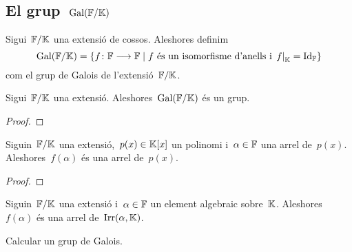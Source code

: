 \documentclass[../Apunts.tex]{subfiles}
\begin{document}
\subsection{El grup~\(\operatorname{Gal}(\mathbb{F}/\mathbb{K})\)}
	\begin{definition}
		\label{def:el grup de Galois}
		\label{def:grup de Galois}
		Sigui~\(\mathbb{F}/\mathbb{K}\) una extensió de cossos. Aleshores definim
		\[\Gal(\FF\extensio\KK)=\{f\colon\FF\longrightarrow\FF\mid f\text{ és un isomorfisme d'anells i }\left.f\right|_{\KK}=\Id_{\FF}\}\]
		com el grup de Galois de l'extensió~\(\mathbb{F}/\mathbb{K}\).
	\end{definition}
	\begin{proposition}
		\label{prop:el grup de Galois és un grup}
		Sigui~\(\mathbb{F}/\mathbb{K}\) una extensió. Aleshores~\(\operatorname{Gal}(\mathbb{F}/\mathbb{K})\) és un grup.
		\begin{proof}
		\end{proof}
	\end{proposition}
	\begin{proposition}
		\label{prop:els morfismes del grup de Galois conserven les arrels dels polinomis sobre K}
		Siguin~\(\mathbb{F}/\mathbb{K}\) una extensió,~\(p(x)\in\mathbb{K}[x]\) un polinomi i~\(\alpha\in\mathbb{F}\) una arrel de~\(p(x)\). Aleshores~\(f(\alpha)\) és una arrel de~\(p(x)\).
		\begin{proof}
		\end{proof}
	\end{proposition}
	\begin{corollary}
		\label{cor:els morfismes del grup de Galois conserven les arrels dels polinomis sobre K}
		Siguin~\(\mathbb{F}/\mathbb{K}\) una extensió i~\(\alpha\in\mathbb{F}\) un element algebraic sobre~\(\mathbb{K}\). Aleshores~\(f(\alpha)\) és una arrel de~\(\operatorname{Irr}(\alpha,\mathbb{K})\).
	\end{corollary}
	\begin{example}
		\label{ex:càlcul d'un grup de Galois}
		Calcular un grup de Galois.
		\begin{solution}
		\end{solution}
	\end{example}
\end{document}
